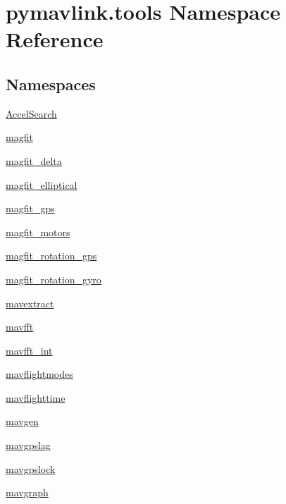 \hypertarget{namespacepymavlink_1_1tools}{}\section{pymavlink.\+tools Namespace Reference}
\label{namespacepymavlink_1_1tools}
\subsection*{Namespaces}
\begin{DoxyCompactItemize}
\item 
 \hyperlink{namespacepymavlink_1_1tools_1_1AccelSearch}{Accel\+Search}
\item 
 \hyperlink{namespacepymavlink_1_1tools_1_1magfit}{magfit}
\item 
 \hyperlink{namespacepymavlink_1_1tools_1_1magfit__delta}{magfit\+\_\+delta}
\item 
 \hyperlink{namespacepymavlink_1_1tools_1_1magfit__elliptical}{magfit\+\_\+elliptical}
\item 
 \hyperlink{namespacepymavlink_1_1tools_1_1magfit__gps}{magfit\+\_\+gps}
\item 
 \hyperlink{namespacepymavlink_1_1tools_1_1magfit__motors}{magfit\+\_\+motors}
\item 
 \hyperlink{namespacepymavlink_1_1tools_1_1magfit__rotation__gps}{magfit\+\_\+rotation\+\_\+gps}
\item 
 \hyperlink{namespacepymavlink_1_1tools_1_1magfit__rotation__gyro}{magfit\+\_\+rotation\+\_\+gyro}
\item 
 \hyperlink{namespacepymavlink_1_1tools_1_1mavextract}{mavextract}
\item 
 \hyperlink{namespacepymavlink_1_1tools_1_1mavfft}{mavfft}
\item 
 \hyperlink{namespacepymavlink_1_1tools_1_1mavfft__int}{mavfft\+\_\+int}
\item 
 \hyperlink{namespacepymavlink_1_1tools_1_1mavflightmodes}{mavflightmodes}
\item 
 \hyperlink{namespacepymavlink_1_1tools_1_1mavflighttime}{mavflighttime}
\item 
 \hyperlink{namespacepymavlink_1_1tools_1_1mavgen}{mavgen}
\item 
 \hyperlink{namespacepymavlink_1_1tools_1_1mavgpslag}{mavgpslag}
\item 
 \hyperlink{namespacepymavlink_1_1tools_1_1mavgpslock}{mavgpslock}
\item 
 \hyperlink{namespacepymavlink_1_1tools_1_1mavgraph}{mavgraph}

\end{DoxyCompactItemize}
